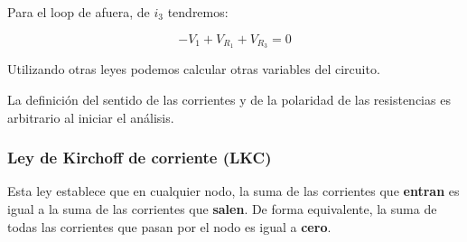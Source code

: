 \begin{example}
Para el loop de afuera, de $i_3$ tendremos:

\begin {equation*}
-V_1 + V_{R_1} + V_{R_3} =0
\end {equation*}

 Utilizando otras leyes podemos calcular otras variables del circuito.

 \begin{remark}
     La definición del sentido de las corrientes y de la polaridad de las resistencias es arbitrario al iniciar el análisis. 
 \end{remark}
\end{example}

\newpage
\subsubsection{Ley de Kirchoff de corriente (LKC)}
Esta ley establece que en cualquier nodo, la suma de las corrientes que \textbf{entran} es igual a la suma de las corrientes que \textbf{salen}. De forma equivalente, la suma de todas las corrientes que pasan por el nodo es igual a \textbf{cero}.
